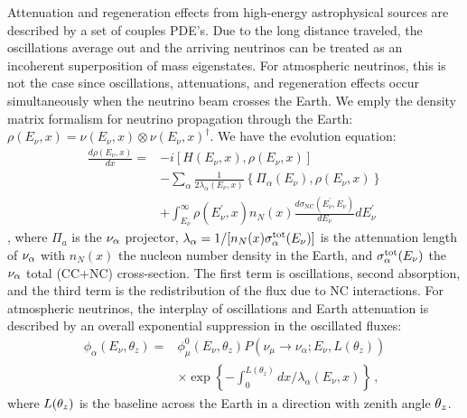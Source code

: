 \documentclass[twocolumn]{article}
\begin{document}
Attenuation and regeneration effects from high-energy astrophysical sources are described by a set of couples PDE's. Due to the long distance traveled, the oscillations average out and the arriving neutrinos can be treated as an incoherent superposition of mass eigenstates. For atmospheric neutrinos, this is not the case since oscillations, attenuations, and regeneration effects occur simultaneously when the neutrino beam crosses the Earth. We emply the density matrix formalism for neutrino propagation through the Earth: $\rho\left(E_{\nu}, x\right)=\nu\left(E_{\nu}, x\right) \otimes \nu\left(E_{\nu}, x\right)^{\dagger}$. We have the evolution equation:
\begin{align*}
\frac{d \rho\left(E_{\nu}, x\right)}{d x}=&-i\left[H\left(E_{\nu}, x\right), \rho\left(E_{\nu}, x\right)\right] \\
&-\sum_{\alpha} \frac{1}{2 \lambda_{\alpha}\left(E_{\nu}, x\right)}\left\{\Pi_{\alpha}\left(E_{\nu}\right), \rho\left(E_{\nu}, x\right)\right\} \\
&+\int_{E_{\nu}}^{\infty} \rho\left(E_{\nu}^{\prime}, x\right) n_{N}(x) \frac{d \sigma_{\mathrm{NC}}\left(E_{\nu}^{\prime}, E_{\nu}\right)}{d E_{\nu}} d E_{\nu}^{\prime}
\end{align*},
where $\Pi_a$ is the $\nu_\alpha$ projector, $\lambda_{\alpha} = 1/[n_N(x) \sigma^{\text{{tot}}}_{\alpha}(E_\nu)]$ is the attenuation length of $\nu_\alpha$ with $n_N(x)$ the nucleon number density in the Earth, and $\sigma^{\text{{tot}}}_\alpha(E_\nu)$ the $\nu_\alpha$ total (CC+NC) cross-section. The first term is oscillations, second absorption, and the third term is the redistribution of the flux due to NC interactions. 
For atmospheric neutrinos, the interplay of oscillations and Earth attenuation is described by an overall exponential suppression in the oscillated fluxes:
\begin{align*}
\phi_{\alpha}\left(E_{\nu}, \theta_{z}\right)=& \phi_{\mu}^{0}\left(E_{\nu}, \theta_{z}\right) P\left(\nu_{\mu} \rightarrow \nu_{\alpha} ; E_{\nu}, L\left(\theta_{z}\right)\right) \\
& \times \exp \left\{-\int_{0}^{L\left(\theta_{z}\right)} d x / \lambda_{\alpha}\left(E_{\nu}, x\right)\right\}
\,,\end{align*}
where $L(\th_z)$ is the baseline across the Earth in a direction with zenith angle $\th_z$.
\end{document}
